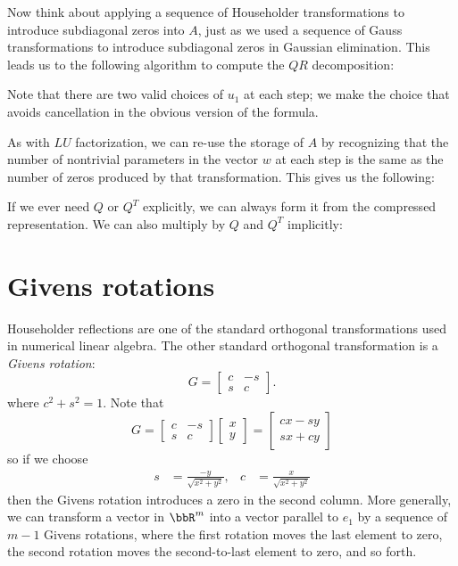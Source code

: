 \documentclass[12pt, leqno]{article} %
\begin{document}
Now think about applying a sequence of Householder transformations to
introduce subdiagonal zeros into $A$, just as we used a sequence of Gauss
transformations to introduce subdiagonal zeros in Gaussian elimination.
This leads us to the following algorithm to compute the $QR$
decomposition:

Note that there are two valid choices of $u_1$ at each step;
we make the choice that avoids cancellation in the obvious version
of the formula.

As with $LU$ factorization, we can re-use the storage of $A$ by recognizing
that the number of nontrivial parameters in the vector $w$ at each step
is the same as the number of zeros produced by that transformation.
This gives us the following:


If we ever need $Q$ or $Q^T$ explicitly, we can always form it from
the compressed representation.  We can also multiply by $Q$ and $Q^T$
implicitly:



\section{Givens rotations}

Householder reflections are one of the standard orthogonal
transformations used in numerical linear algebra.  The other standard
orthogonal transformation is a {\em Givens rotation}:
\[
  G = \begin{bmatrix}
    c & -s \\
    s & c
  \end{bmatrix}.
\]
where $c^2 + s^2 = 1$.  Note that
\[
  G = \begin{bmatrix}
    c & -s \\
    s & c
  \end{bmatrix}
  \begin{bmatrix}
    x \\ y
  \end{bmatrix} =
  \begin{bmatrix}
    cx - sy \\
    sx + cy
  \end{bmatrix}
\]
so if we choose
\begin{align*}
  s &= \frac{-y}{\sqrt{x^2 + y^2}}, &
  c &= \frac{x}{\sqrt{x^2+y^2}}
\end{align*}
then the Givens rotation introduces a zero in the second column.
More generally, we can transform a vector in $\bbR^m$ into a vector
parallel to $e_1$ by a sequence of $m-1$ Givens rotations, where
the first rotation moves the last element to zero, the second rotation
moves the second-to-last element to zero, and so forth.
\end{document}

